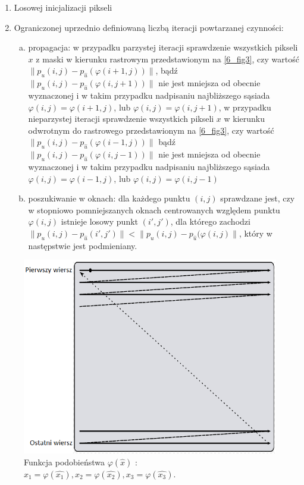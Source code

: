 \documentclass[12pt, twoside, openany]{report}
\theoremstyle{definition}
\begin{document}
\begin{enumerate}
\item
Losowej inicjalizacji pikseli
\item
Ograniczonej uprzednio definiowaną liczbą iteracji powtarzanej czynności:
\begin{enumerate}[a)]
\item
propagacja: w przypadku parzystej iteracji sprawdzenie wszystkich pikseli $x$ z maski w kierunku rastrowym przedstawionym na \autoref{6_fig3}, czy 
wartość $\big\| p_{u}(i,j) - p_{\hat{u}}(\varphi(i+1,j)) \big\|$, bądź $\big\| p_{u}(i,j) - p_{\hat{u}}(\varphi(i,j+1)) \big\|$ nie jest mniejsza od obecnie wyznaczonej i w takim przypadku nadpisaniu najbliższego sąsiada $\varphi(i,j) = \varphi(i+1,j)$, lub $\varphi(i,j) = \varphi(i,j+1)$, 
w przypadku nieparzystej iteracji sprawdzenie wszystkich pikseli $x$ w kierunku odwrotnym do rastrowego przedstawionym na \autoref{6_fig3}, czy 
wartość $\big\| p_{u}(i,j) - p_{\hat{u}}(\varphi(i-1,j)) \big\|$ bądź $\big\| p_{u}(i,j) - p_{\hat{u}}(\varphi(i,j-1)) \big\|$ nie jest mniejsza od obecnie wyznaczonej i w takim przypadku nadpisaniu najbliższego sąsiada $\varphi(i,j) = \varphi(i-1,j)$, lub $\varphi(i,j) = \varphi(i,j-1)$
\item
poszukiwanie w oknach: dla każdego punktu $(i,j)$ sprawdzane jest, czy w stopniowo pomniejszanych oknach centrowanych względem punktu $\varphi(i,j)$ istnieje losowy punkt $(i', j')$, dla którego zachodzi $\big\| p_{u}(i,j) - p_{\hat{u}}(i',j') \big\| < \big\| p_{u}(i,j) - p_{\hat{u}}(\varphi(i,j) \big\|$, który w następstwie jest podmieniany.
\end{enumerate}
\end{enumerate}
\begin{figure}[!h]
	\centering
	\includegraphics[scale=0.5]{rysunki/6_fig3}
	\caption{Funkcja podobieństwa $\varphi(\hat{x})$ : $x_1 = \varphi(\hat{x_1}), x_2 = \varphi(\hat{x_2}), x_3 = \varphi(\hat{x_3})$.}
	\label{6_fig3}
\end{figure}
\end{document}
